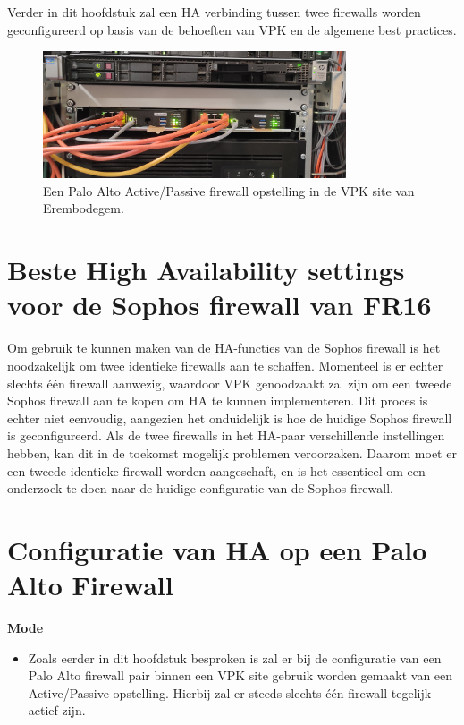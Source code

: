 Verder in dit hoofdstuk zal een HA verbinding tussen twee firewalls worden geconfigureerd op basis van de behoeften van VPK en de algemene best practices.

\begin{figure}[H]
    \centering
    \includegraphics[width=0.8\textwidth]{fotos/PA_FirewallPairBE02.jpg}
    \caption[Palo Alto Active/Passive pair]{\label{fig:grail}Een Palo Alto Active/Passive firewall opstelling in de VPK site van Erembodegem.}
\end{figure} 



\section{Beste High Availability settings voor de Sophos firewall van FR16}

Om gebruik te kunnen maken van de HA-functies van de Sophos firewall is het noodzakelijk om twee identieke firewalls aan te schaffen. Momenteel is er echter slechts één firewall aanwezig, waardoor VPK genoodzaakt zal zijn om een tweede Sophos firewall aan te kopen om HA te kunnen implementeren. Dit proces is echter niet eenvoudig, aangezien het onduidelijk is hoe de huidige Sophos firewall is geconfigureerd. Als de twee firewalls in het HA-paar verschillende instellingen hebben, kan dit in de toekomst mogelijk problemen veroorzaken. Daarom moet er een tweede identieke firewall worden aangeschaft, en is het essentieel om een onderzoek te doen naar de huidige configuratie van de Sophos firewall.






\section{Configuratie van HA op een Palo Alto Firewall}

\textbf{Mode}
    \begin{itemize}[label=\textbullet]
        \item Zoals eerder in dit hoofdstuk besproken is zal er bij de configuratie van een Palo Alto firewall pair binnen een VPK site gebruik worden gemaakt van een Active/Passive opstelling. Hierbij zal er steeds slechts één firewall tegelijk actief zijn.
    \end{itemize}



